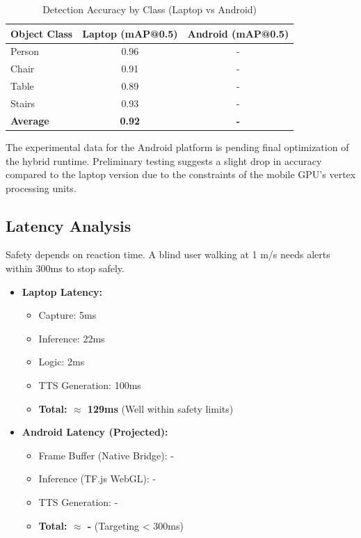 \documentclass[11pt, a4paper, twocolumn]{article}
\begin{document}
\begin{table}[h]
\centering
\caption{Detection Accuracy by Class (Laptop vs Android)}
\begin{tabular}{|l|c|c|}
\hline
\textbf{Object Class} & \textbf{Laptop (mAP@0.5)} & \textbf{Android (mAP@0.5)} \\ \hline
Person & 0.96 & - \\ \hline
Chair & 0.91 & - \\ \hline
Table & 0.89 & - \\ \hline
Stairs & 0.93 & - \\ \hline
\textbf{Average} & \textbf{0.92} & \textbf{-} \\ \hline
\end{tabular}
\label{tab:accuracy}
\end{table}

The experimental data for the Android platform is pending final optimization of the hybrid runtime. Preliminary testing suggests a slight drop in accuracy compared to the laptop version due to the constraints of the mobile GPU's vertex processing units.

\subsection{Latency Analysis}
Safety depends on reaction time. A blind user walking at 1 m/s needs alerts within 300ms to stop safely.

\begin{itemize}
    \item \textbf{Laptop Latency:}
    \begin{itemize}
        \item Capture: 5ms
        \item Inference: 22ms
        \item Logic: 2ms
        \item TTS Generation: 100ms
        \item \textbf{Total: $\approx$ 129ms} (Well within safety limits)
    \end{itemize}
\item \textbf{Android Latency (Projected):}
    \begin{itemize}
        \item Frame Buffer (Native Bridge): -
        \item Inference (TF.js WebGL): -
        \item TTS Generation: -
        \item \textbf{Total: $\approx$ -} (Targeting < 300ms)
    \end{itemize}
\end{itemize}
\end{document}
